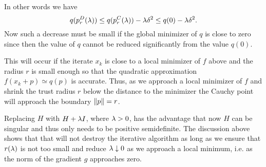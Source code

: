 \noindent
In other words we have
$$
q(p^D_r(\lambda))\leq q(p^C_r(\lambda))-\lambda\delta^2\leq q(0)-\lambda\delta^2.  
$$  
Now such a decrease must be small if the global minimizer of $q$ is 
close to zero since then the value of $q$ cannot be reduced significantly from
the value $q(0)$. 

This will occur if the iterate $x_k$ is close to a local minimizer 
of $f$ above and the radius $r$ is small enough so that the quadratic
approximation $f(x_k+p)\simeq q(p)$ is accurate.
Thus, as we approach a local minimizer of $f$ and shrink the trust radius $r$ 
below the distance to the minimizer the Cauchy point will approach the boundary 
$\left\|p\right\|=r$. 

Replacing $H$ with $H+\lambda I$, where $\lambda>0$, has the advantage that now $H$ can
be singular and thus only needs to be positive semidefinite. The discussion 
above shows that that will not destroy the iterative algorithm as long as we 
ensure that $r(\lambda)$ is not too small and reduce $\lambda\downarrow 0$ as we approach
a local minimum, i.e. as the norm of the gradient $g$ approaches zero.

